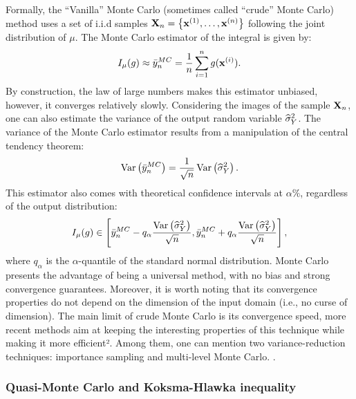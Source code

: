 Formally, the ``Vanilla'' Monte Carlo (sometimes called ``crude'' Monte Carlo) method uses a set of i.i.d samples ${\bf X}_n = \left\{{\bf x}^{(1)}, \dots, {\bf x}^{(n)}\right\}$ following the joint distribution of $\mu$. 
The Monte Carlo estimator of the integral  is given by: 
\begin{equation}
    I_{\mu}(g) \approx \Bar{y}_n^{MC} = \frac1n \sum_{i=1}^{n} g({\bf x}^{(i)}).
\end{equation}
By construction, the law of large numbers makes this estimator unbiased, however, it converges relatively slowly. 
Considering the images of the sample ${\bf X}_n$, one can also estimate the variance of the output random variable $\widehat{\sigma}^2_Y$.
The variance of the Monte Carlo estimator  results from a manipulation of the central tendency theorem:
\begin{equation}
    \operatorname{Var}\left(\Bar{y}_n^{MC}\right) = \frac{1}{\sqrt{n}} \operatorname{Var}\left(\widehat{\sigma}^2_Y\right). 
\end{equation}
This estimator also comes with theoretical confidence intervals at $\alpha \%$, regardless of the output distribution: 
\begin{equation}
    I_{\mu}(g) \in \left[\Bar{y}_n^{MC}  - q_\alpha \frac{\operatorname{Var}\left(\widehat{\sigma}^2_Y\right)}{\sqrt{n}}, \Bar{y}_n^{MC}  + q_\alpha \frac{\operatorname{Var}\left(\widehat{\sigma}^2_Y\right)}{\sqrt{n}} \right],
\end{equation}
where $q_\alpha$ is the $\alpha$-quantile of the standard normal distribution.
Monte Carlo presents the advantage of being a universal method, with no bias and strong convergence guarantees. 
Moreover, it is worth noting that its convergence properties do not depend on the dimension of the input domain (i.e., no curse of dimension).
The main limit of crude Monte Carlo is its convergence speed, more recent methods aim at keeping the interesting properties of this technique while making it more efficient².
Among them, one can mention two variance-reduction techniques: importance sampling and multi-level Monte Carlo. 
.



\subsubsection{Quasi-Monte Carlo and Koksma-Hlawka inequality}

